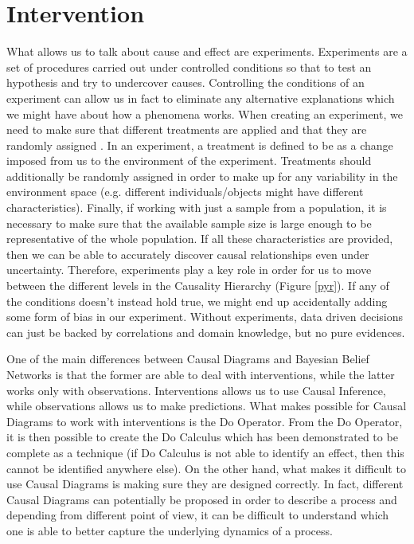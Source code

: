\section{Intervention}
What allows us to talk about cause and effect are experiments. Experiments are a set of procedures carried out under controlled conditions so that to test an hypothesis and try to undercover causes. Controlling the conditions of an experiment can allow us in fact to eliminate any alternative explanations which we might have about how a phenomena works. When creating an experiment, we need to make sure that different treatments are applied and that they are randomly assigned \cite{cassie}. In an experiment, a treatment is defined to be as a change imposed from us to the environment of the experiment. Treatments should additionally be randomly assigned in order to make up for any variability in the environment space (e.g. different individuals/objects might have different characteristics). Finally, if working with just a sample from a population, it is necessary to make sure that the available sample size is large enough to be representative of the whole population. If all these characteristics are provided, then we can be able to accurately discover causal relationships even under uncertainty. Therefore, experiments play a key role in order for us to move between the different levels in the Causality Hierarchy (Figure \ref{pyr}). If any of the conditions doesn't instead hold true, we might end up accidentally adding some form of bias in our experiment. Without experiments, data driven decisions can just be backed by correlations and domain knowledge, but no pure evidences.

One of the main differences between Causal Diagrams and Bayesian Belief Networks is that the former are able to deal with interventions, while the latter works only with observations. Interventions allows us to use Causal Inference, while observations allows us to make predictions. What makes possible for Causal Diagrams to work with interventions is the Do Operator. From the Do Operator, it is then possible to create the Do Calculus which has been demonstrated to be complete as a technique (if Do Calculus is not able to identify an effect, then this cannot be identified anywhere else). On the other hand, what makes it difficult to use Causal Diagrams is making sure they are designed correctly. In fact, different Causal Diagrams can potentially be proposed in order to describe a process and depending from different point of view, it can be difficult to understand which one is able to better capture the underlying dynamics of a process.

